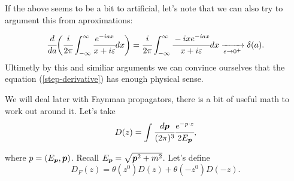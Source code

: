 \documentclass[main.tex]{subfiles}
\begin{document}
If the above seems to be a bit to artificial, let's note that we can also try to argument this from aproximations:

\begin{equation}
\cfrac{d}{da}\bigg(\cfrac{i}{2\pi} \int_{-\infty}^\infty  \cfrac{e^{-iax}}{x + i\epsilon} dx\bigg) = \cfrac{i}{2\pi} \int_{-\infty}^\infty  \cfrac{-i x e^{-iax}}{x + i\epsilon} dx
\xrightarrow[\epsilon \to 0^+]{} \delta(a).
\end{equation}
Ultimetly by this and similiar arguments we can convince ourselves that the equation (\ref{step-derivative}) has enough physical sense. 

We will deal later with Faynman propagators, there is a bit of useful math to work out around it.
Let's take
\begin{equation}
D(z) =  \int \cfrac{d \bs{p}}{(2\pi)^3}
\cfrac{e^{-p \cdot z}}{2E_{\bs{p}}}, 
\end{equation}

where $p = (E_{\bs{p}}, \bs{p})$. Recall $E_{\bs{p}} = \sqrt{\bs{p}^2 + m^2}$.
Let's define 
\begin{equation}
D_F(z) = \theta(z^0)D(z) + \theta(-z^0)D(-z).
\end{equation}
\end{document}

